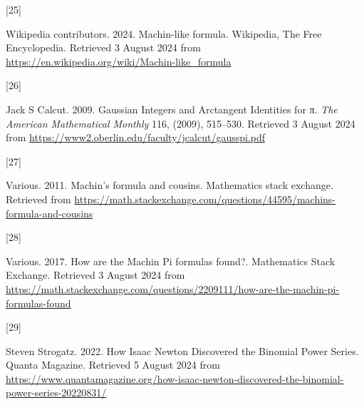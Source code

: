\documentclass[
  a4paper,
]{article}
\newlength{\cslhangindent}
\newlength{\csllabelwidth}
\newenvironment{CSLReferences}[2] %
 {\begin{list}{}{%
  \setlength{\itemindent}{0pt}
  \setlength{\leftmargin}{0pt}
  \setlength{\parsep}{0pt}
  \ifodd #1
   \setlength{\leftmargin}{\cslhangindent}
   \setlength{\itemindent}{-1\cslhangindent}
  \fi
  \setlength{\itemsep}{#2\baselineskip}}}
 {\end{list}}
\newcommand{\CSLLeftMargin}[1]{\parbox[t]{\csllabelwidth}{\strut#1\strut}}
\newcommand{\CSLRightInline}[1]{\parbox[t]{\linewidth - \csllabelwidth}{\strut#1\strut}}
\begin{document}
\begin{CSLReferences}{0}{0}
\CSLLeftMargin{{[}25{]} }%
\CSLRightInline{Wikipedia contributors. 2024. {Machin-like formula}.
{Wikipedia, The Free Encyclopedia}. Retrieved 3 August 2024 from
\url{https://en.wikipedia.org/wiki/Machin-like_formula}}

\CSLLeftMargin{{[}26{]} }%
\CSLRightInline{Jack S Calcut. 2009. {Gaussian Integers and Arctangent
Identities for π}. \emph{{The American Mathematical Monthly}} 116,
(2009), 515--530. Retrieved 3 August 2024 from
\url{https://www2.oberlin.edu/faculty/jcalcut/gausspi.pdf}}

\CSLLeftMargin{{[}27{]} }%
\CSLRightInline{Various. 2011. {Machin's formula and cousins}.
Mathematics stack exchange. Retrieved from
\url{https://math.stackexchange.com/questions/44595/machins-formula-and-cousins}}

\CSLLeftMargin{{[}28{]} }%
\CSLRightInline{Various. 2017. {How are the Machin Pi formulas found?}.
{Mathematics Stack Exchange}. Retrieved 3 August 2024 from
\url{https://math.stackexchange.com/questions/2209111/how-are-the-machin-pi-formulas-found}}

\CSLLeftMargin{{[}29{]} }%
\CSLRightInline{Steven Strogatz. 2022. {How Isaac Newton Discovered the
Binomial Power Series}. {Quanta Magazine}. Retrieved 5 August 2024 from
\url{https://www.quantamagazine.org/how-isaac-newton-discovered-the-binomial-power-series-20220831/}}

\end{CSLReferences}
\end{document}
